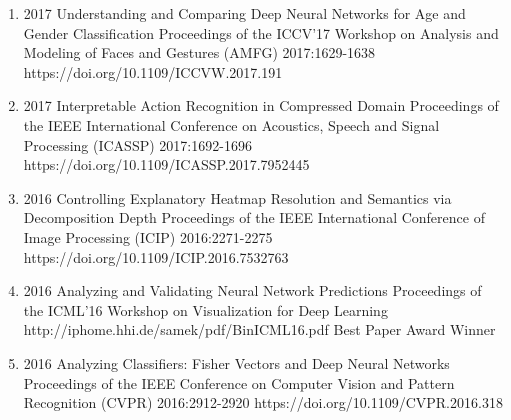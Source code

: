 {\begin{enumerate}
        \item {}
                                {2017}
                                {Understanding and Comparing Deep Neural Networks for Age and Gender Classification}
                                {Proceedings of the ICCV'17 Workshop on Analysis and Modeling of Faces and Gestures (AMFG)}
                                {2017:1629-1638}
                                {https://doi.org/10.1109/ICCVW.2017.191}

        \item {}
                                {2017}
                                {Interpretable Action Recognition in Compressed Domain}
                                {Proceedings of the IEEE International Conference on Acoustics, Speech and Signal Processing (ICASSP)}
                                {2017:1692-1696}
                                {https://doi.org/10.1109/ICASSP.2017.7952445}


        \item {}
                                {2016}
                                {Controlling Explanatory Heatmap Resolution and Semantics via Decomposition Depth}
                                {Proceedings of the IEEE International Conference of Image Processing (ICIP)}
                                {2016:2271-2275}
                                {https://doi.org/10.1109/ICIP.2016.7532763}


        \item {}
                                {2016}
                                {Analyzing and Validating Neural Network Predictions}
                                {Proceedings of the ICML'16 Workshop on Visualization for Deep Learning}
                                {}
                                {http://iphome.hhi.de/samek/pdf/BinICML16.pdf}
                                {Best Paper Award Winner}

        \item {}
                                {2016}
                                {Analyzing Classifiers: Fisher Vectors and Deep Neural Networks}
                                {Proceedings of the IEEE Conference on Computer Vision and Pattern Recognition (CVPR)}
                                {2016:2912-2920}
                                {https://doi.org/10.1109/CVPR.2016.318}


\end{enumerate}}
